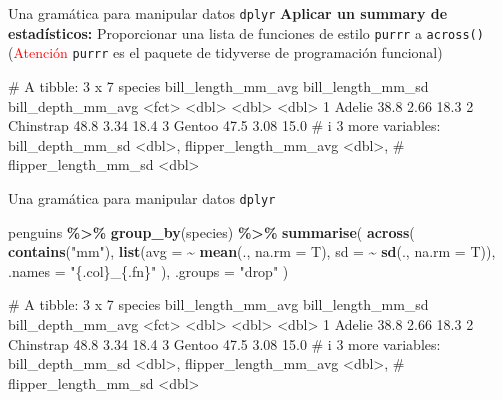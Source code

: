 \documentclass[
  ignorenonframetext,
  aspectratio=169]{beamer}
\newenvironment{Shaded}{\begin{snugshade}}{\end{snugshade}}
\newcommand{\AttributeTok}[1]{\textcolor[rgb]{0.13,0.29,0.53}{#1}}
\newcommand{\FunctionTok}[1]{\textcolor[rgb]{0.13,0.29,0.53}{\textbf{#1}}}
\newcommand{\NormalTok}[1]{#1}
\newcommand{\SpecialCharTok}[1]{\textcolor[rgb]{0.81,0.36,0.00}{\textbf{#1}}}
\newcommand{\StringTok}[1]{\textcolor[rgb]{0.31,0.60,0.02}{#1}}
\let\oldverbatim\verbatim
\let\endoldverbatim\endverbatim
\renewenvironment{verbatim}{\tiny\oldverbatim}{\endoldverbatim}
\newcommand\red[1]{\textcolor{red}{#1}}
\begin{document}
\begin{frame}[fragile]{Una gramática para manipular datos
\texttt{dplyr}}
\label{una-gramuxe1tica-para-manipular-datos-dplyr-9}
\textbf{Aplicar un summary de estadísticos:} Proporcionar una lista de
funciones de estilo \texttt{purrr} a \texttt{across()} (\red{Atención}
\texttt{purrr} es el paquete de tidyverse de programación funcional)

\begin{verbatim}
# A tibble: 3 x 7
  species   bill_length_mm_avg bill_length_mm_sd bill_depth_mm_avg
  <fct>                  <dbl>             <dbl>             <dbl>
1 Adelie                  38.8              2.66              18.3
2 Chinstrap               48.8              3.34              18.4
3 Gentoo                  47.5              3.08              15.0
# i 3 more variables: bill_depth_mm_sd <dbl>, flipper_length_mm_avg <dbl>,
#   flipper_length_mm_sd <dbl>
\end{verbatim}
\end{frame}

\begin{frame}[fragile]{Una gramática para manipular datos
\texttt{dplyr}}
\label{una-gramuxe1tica-para-manipular-datos-dplyr-10}
\begin{Shaded}
\begin{Highlighting}[]
\NormalTok{penguins }\SpecialCharTok{\%\textgreater{}\%}
  \FunctionTok{group\_by}\NormalTok{(species) }\SpecialCharTok{\%\textgreater{}\%}
  \FunctionTok{summarise}\NormalTok{(}
    \FunctionTok{across}\NormalTok{(}
      \FunctionTok{contains}\NormalTok{(}\StringTok{"mm"}\NormalTok{),}
      \FunctionTok{list}\NormalTok{(}\AttributeTok{avg =} \SpecialCharTok{\textasciitilde{}} \FunctionTok{mean}\NormalTok{(., }\AttributeTok{na.rm =}\NormalTok{ T), }\AttributeTok{sd =} \SpecialCharTok{\textasciitilde{}} \FunctionTok{sd}\NormalTok{(., }\AttributeTok{na.rm =}\NormalTok{ T)),}
      \AttributeTok{.names =} \StringTok{"\{.col\}\_\{.fn\}"}
\NormalTok{    ),}
    \AttributeTok{.groups =} \StringTok{"drop"}
\NormalTok{  )}
\end{Highlighting}
\end{Shaded}

\begin{verbatim}
# A tibble: 3 x 7
  species   bill_length_mm_avg bill_length_mm_sd bill_depth_mm_avg
  <fct>                  <dbl>             <dbl>             <dbl>
1 Adelie                  38.8              2.66              18.3
2 Chinstrap               48.8              3.34              18.4
3 Gentoo                  47.5              3.08              15.0
# i 3 more variables: bill_depth_mm_sd <dbl>, flipper_length_mm_avg <dbl>,
#   flipper_length_mm_sd <dbl>
\end{verbatim}
\end{frame}
\end{document}
